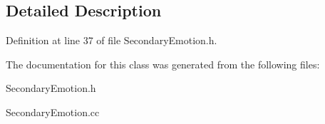 \subsection{\-Detailed \-Description}


\-Definition at line 37 of file \-Secondary\-Emotion.\-h.



\-The documentation for this class was generated from the following files\-:\begin{DoxyCompactItemize}
\item 
\-Secondary\-Emotion.\-h\item 
\-Secondary\-Emotion.\-cc\end{DoxyCompactItemize}
